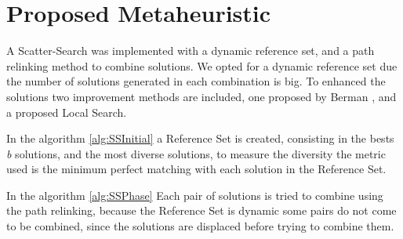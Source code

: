 \section{Proposed Metaheuristic}
A Scatter-Search was implemented
with a dynamic reference set,
and a path relinking method
to combine solutions.
We opted for a dynamic reference set
due the number of solutions generated
in each combination is big.
To enhanced the solutions
two improvement methods are included,
one proposed by Berman \cite{berman1987stochastic},
and a proposed Local Search.


In the algorithm \ref{alg:SSInitial}
a Reference Set is created,
consisting in the bests \textit{b} solutions,
and the most diverse  solutions,
to measure the diversity
the metric used is
the minimum perfect matching
with each solution in the Reference Set.


In the algorithm \ref{alg:SSPhase}
Each pair  of solutions
is tried to combine
using the path relinking,
because the Reference Set is dynamic
some pairs do not come to be combined,
since the solutions
are displaced
before trying to combine them.
